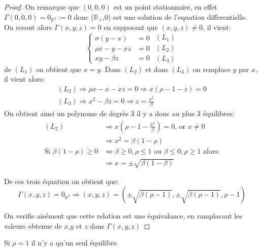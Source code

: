 \documentclass{article}
\newcommand{\R}{\mathbb{R}}
\newtheorem[M , nocut]{prop}{Proposition}[section]
\newtheorem[M]{propt}{Propriété}[section]
\newtheorem[L , nocut]{thm}{Théoreme}
\newtheorem[L]{cor}{Corollaire}
\begin{document}
\begin{proof}
On remarque que $(0,0,0)$ est un point stationnaire, en effet $\Gamma(0,0,0) = 0_{\R^3}:= 0$ donc ($\R_+$,0) est une solution de l'equation differentielle.\\
On resout alors $\Gamma(x,y,z)=0$ en supposant que $(x,y,z) \neq 0$, il vient:
\[
\left\{\begin{array}{rl} %
     \sigma(y-x)&=0  \\
     \rho x -y -xz&=0\\
     xy - \beta z&=0
\end{array}\right.
\begin{array}{c} %
    (L_1)\\
    (L_2)\\
    (L_3)
\end{array}
\]
de $(L_1)$ on obtient que $x=y$. Dans $(L_2)$ et dans $(L_3)$ on remplace $y$ par $x$, il vient alors:
\begin{gather*}
    (L_2) \Rightarrow \rho x - x - xz = 0 \Rightarrow x (\rho -1 -z ) = 0 \\
    (L_3) \Rightarrow x^2 - \beta z = 0 \Rightarrow z = \frac{x^2}{\beta}
\end{gather*}
On obtient ainsi un polynome de degrès 3 il y a donc au plus 3 équilibres:
\begin{align*}
    (L_2) & \Rightarrow x (\rho - 1 - \frac{x^2}{\beta}) = 0 \text{, or }x \neq 0\\
        & \Rightarrow x^2 = \beta (1-\rho)\\
    \text{Si } \beta(1-\rho) \ge 0 & \Leftrightarrow \beta \ge 0,\rho\le 1 \text{ ou } \beta \le 0,\rho\ge 1\text{ alors:}\\
    &\Rightarrow x = \pm \sqrt{\beta(1-\beta)}
\end{align*}

De ces trois équation on obtient que:
\[
    \Gamma(x,y,z)=0_{\R^3} \Rightarrow (x,y,z) = (\pm \sqrt{ \beta (\rho -1)} ,\pm \sqrt{\beta (\rho -1)}, \rho -1)
\]

On verifie aisément que cette relation est une \'equivalance, en ramplacant les valeurs obtenue de $x$,$y$ et $z$ dans $\Gamma(x,y,z)$
\end{proof}

\begin{example}[Remarque]
    Si $\rho=1$ il n'y a qu'un seul équilibre.
\end{example}
\end{document}
